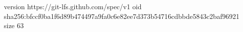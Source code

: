 version https://git-lfs.github.com/spec/v1
oid sha256:bfccf0ba1f6d89b474497a9fa0c6e82ee7d373b54716cdbbde5843c2baf96921
size 63
